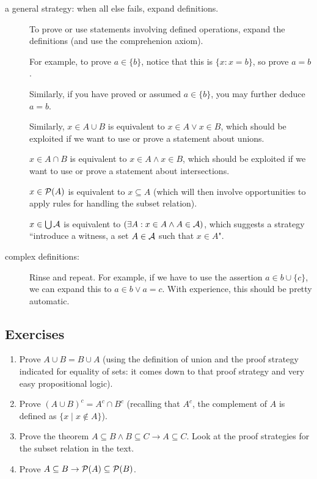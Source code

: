 \documentclass[12pt]{book}
\begin{document}
\begin{description}
\item[a general strategy:  when all else fails, expand definitions.]

To prove or use statements involving defined operations, expand the definitions (and use the comprehenion axiom).

For example, to prove $a \in \{b\}$, notice that this is $\{x:x=b\}$, so prove $a=b$.

Similarly, if you have proved or assumed $a \in \{b\}$, you may further deduce $a=b$.

Similarly, $x \in A \cup B$ is equivalent to $x \in A \vee x \in B$, which should be exploited if we want to use or prove a statement about unions.

$x \in A \cap B$ is equivalent to $x \in A \wedge x \in B$, which should be exploited if we want to use or prove a statement about intersections.


$x \in {\cal P}(A)$ is equivalent to $x \subseteq A$ (which will then involve opportunities to apply rules for handling the subset relation).

$x \in \bigcup {\cal A}$ is equivalent to $(\exists A:x \in A \wedge A \in {\cal A})$, which suggests a strategy ``introduce a witness, a set $A \in {\cal A}$ such that $x \in A$".

\item[complex definitions:]  Rinse and repeat.  For example, if we have to use the assertion $a \in b \cup \{c\}$, we can expand this to $a \in b \vee a = c$.  With experience,
this should be pretty automatic.

\end{description}

\newpage

\subsection{Exercises}

\begin{enumerate}

\item Prove $A \cup B = B \cup A$ (using the definition of union and the proof strategy indicated for equality of sets:  it comes down to that proof strategy and very easy propositional logic).

\item Prove $(A \cup B)^c = A^c \cap B^c$ (recalling that $A^c$, the complement of $A$ is defined as $\{x \mid x \not\in A\}$).

\item Prove the theorem $A \subseteq B \wedge B \subseteq C \rightarrow A \subseteq C$.  Look at the proof strategies for the subset relation in the text.

\item Prove $A \subseteq B \rightarrow {\cal P}(A) \subseteq {\cal P}(B)$.

\end{enumerate}
\end{document}
